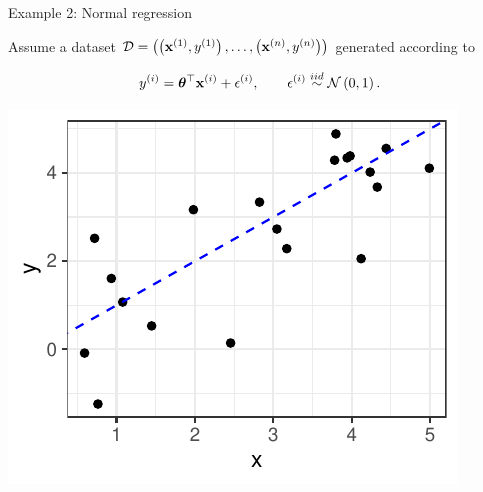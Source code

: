 \documentclass[11pt,compress,t,notes=noshow, xcolor=table]{beamer}
\begin{document}
\begin{vbframe}{Example 2: Normal regression}

Assume a dataset $\mathcal{D} = \left( \left(\mathbf{x}^{(1)}, y^{(1)}\right), \ldots, \left(\mathbf{x}^{(n)}, y^{(n)}\right)\right)$ generated according to

$$
y^{(i)} = \bm{\theta}^\top \mathbf{x}^{(i)} + \epsilon^{(i)}, \qquad \epsilon^{(i)} \overset{iid}{\sim} \mathcal{N}\left(0, 1\right).
$$

\begin{center}
	\includegraphics[height=0.4\textwidth, keepaspectratio]{figure_man/ml_linreg_example_1.pdf} 
\end{center}



\end{vbframe}
\end{document}
